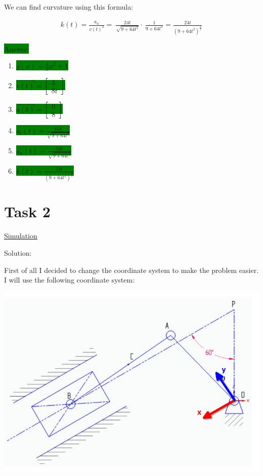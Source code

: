 \documentclass{article}
\begin{document}
We can find curvature using this formula:

\begin{align}
    k(t) = \frac{a_n}{v(t)^2} = \
    \frac{24t}{\sqrt{9 + 64t^2}} \cdot \
    \frac{1}{9 + 64t^2} =
    \frac{24t}{(9 + 64t^2)^\frac{3}{2}}
\end{align}

\colorbox{green}{Answer:}

\begin{enumerate}
    \item \colorbox{green}{$y(x) = \frac{4}{9}x^2 + 1$}
    \item \colorbox{green}{$\vec{v(t)} = \begin{bmatrix}
                      3 \\
                      8t
                  \end{bmatrix}$}
    \item \colorbox{green}{$\vec{a(t)} = \begin{bmatrix}
                      0 \\
                      8
                  \end{bmatrix}$}
    \item \colorbox{green}{$a_t(t) = \frac{64t}{\sqrt{9 + 64t^2}}$}
    \item \colorbox{green}{$a_n(t) = \frac{24t}{\sqrt{9 + 64t^2}}$}
    \item \colorbox{green}{$k(t) = \frac{24t}{(9 + 64t^2)^\frac{3}{2}}$}
\end{enumerate}

\newpage

\section{Task 2}

\href{https://github.com/lvjonok/f22-theoretical-mechanics/blob/master/homework1/motion_task2.gif}{Simulation}

Solution:

First of all I decided to change the coordinate system to make the problem easier. I will use the following coordinate system:

\includegraphics[width=\textwidth]{newcoordsystem.png}
\end{document}
